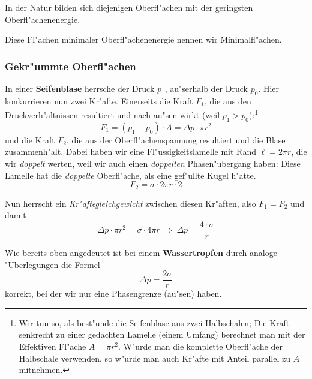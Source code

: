 \begin{Wichtig}
   In der Natur bilden sich diejenigen Oberfl"achen mit der geringsten Oberfl"achenenergie.
\end{Wichtig}
\begin{Def}
Diese Fl"achen minimaler Oberfl"achenenergie nennen wir Minimalfl"achen.
\end{Def}


\subsubsection{Gekr"ummte Oberfl"achen}
\label{kap_gekrummte-oberflachen}

In einer \textbf{Seifenblase} herrsche der Druck $p_1$, au"serhalb der
Druck $p_0$. Hier konkurrieren nun zwei Kr"afte. Einerseits die Kraft
$F_1$, die aus den Druckverh"altnissen resultiert und nach au"sen
wirkt (weil $p_1 > p_0$):\footnote{Wir tun so, als best"unde die
  Seifenblase aus zwei Halbschalen; Die Kraft senkrecht zu einer
  gedachten Lamelle (einem Umfang) berechnet man mit der Effektiven
  Fl"ache $A = \pi r^2$. W"urde man die komplette Oberfl"ache der
  Halbschale verwenden, so w"urde man auch Kr"afte mit Anteil parallel
  zu $A$ mitnehmen.}
\begin{equation}
   \label{eq:88}
   F_1 = (p_1 - p_0) \cdot A = \Delta p \cdot \pi r^2
\end{equation}
und die Kraft $F_2$, die aus der Oberfl"achenspannung resultiert und
die Blase zusammenh"alt. Dabei haben wir eine Fl"ussigkeitslamelle mit
Rand $\ell = 2 \pi r$, die wir \emph{doppelt} werten, weil wir auch
einen \emph{doppelten} Phasen"ubergang haben: Diese Lamelle hat die
\emph{doppelte} Oberfl"ache, als eine gef"ullte Kugel h"atte.
\begin{equation}
   \label{eq:95}
   F_2 = \sigma \cdot 2\pi r \cdot 2
\end{equation}

Nun herrscht ein \emph{Kr"aftegleichgewicht} zwischen diesen Kr"aften,
also $F_1 = F_2$ und damit
\begin{equation}
   \label{eq:96}
   \Delta p \cdot \pi r^2 =  \sigma \cdot 4\pi r ~\Rightarrow ~ \Delta
   p = \frac{4 \cdot \sigma }{r}
\end{equation}

Wie bereits oben angedeutet ist bei einem  \textbf{Wassertropfen}
durch analoge "Uberlegungen die Formel
\begin{equation}
   \label{eq:97}
   \Delta p = \frac{2 \sigma}{r}
\end{equation}
korrekt, bei der wir nur eine Phasengrenze (au"sen) haben.

